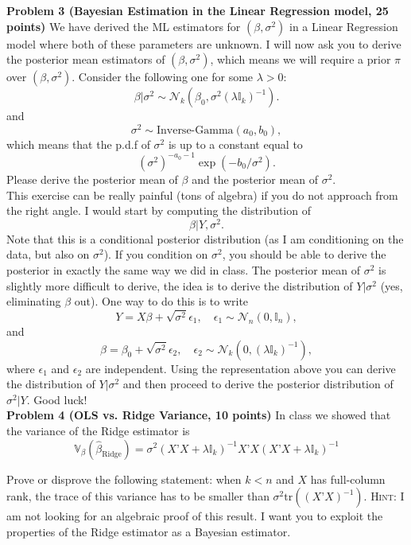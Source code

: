 \documentclass[11pt]{article} %
\begin{document}
\noindent \textbf{Problem 3 (Bayesian Estimation in the Linear Regression model, 25 points)} We have derived the ML estimators for $(\beta, \sigma^2)$ in a Linear Regression model where both of these parameters are unknown. I will now ask you to derive the posterior mean estimators of $(\beta, \sigma^2)$, which means we will require a prior $\pi$ over $(\beta, \sigma^2)$. Consider the following one for some $\lambda > 0$: 
\[ \beta | \sigma^2 \sim \mathcal{N}_k( \beta_0  , \sigma^2 (\lambda \mathbb{I}_k)^{-1} ).     \]
and
\[ \sigma^2 \sim \textrm{Inverse-Gamma} (a_0, b_0), \]
which means that the p.d.f of $\sigma^2$ is up to a constant equal to
\[ (\sigma^2)^{-a_0-1}  \exp \left ( -b_0 / \sigma^2  \right).\]
\noindent Please derive the posterior mean of $\beta$ and the posterior mean of $\sigma^2$. \\

 This exercise can be really painful (tons of algebra) if you do not approach from the right angle. I would start by computing the distribution of
\[ \beta | Y, \sigma^2.\]
Note that this is a conditional posterior distribution (as I am conditioning on the data, but also on $\sigma^2$). If you condition on $\sigma^2$, you should be able to derive the posterior in exactly the same way we did in class. The posterior mean of $\sigma^2$ is slightly more difficult to derive, the idea is to derive the distribution of $Y | \sigma^2$ (yes, eliminating $\beta$ out). One way to do this is to write
\[ Y = X\beta + \sqrt{\sigma^2} \epsilon_1, \quad \epsilon_1 \sim \mathcal{N}_n(0, \mathbb{I}_n), \]
and
\[ \beta = \beta_0 + \sqrt{\sigma^2} \epsilon_2, \quad \epsilon_2 \sim \mathcal{N}_k(0, (\lambda \mathbb{I}_k)^{-1}), \]
where $\epsilon_1$ and $\epsilon_2$ are independent. Using the representation above you can derive the distribution of $Y | \sigma^2$ and then proceed to derive the posterior distribution of $\sigma^2 | Y$.  Good luck!\\

\noindent \textbf{Problem 4 (OLS vs. Ridge Variance, 10 points)} In class we showed that the variance of the Ridge estimator is
\[ \mathbb{V}_{\beta} (\widehat{\beta}_{\textrm{Ridge}}) = \sigma^2( X’X + \lambda \mathbb{I}_k)^{-1} X’X ( X’X + \lambda \mathbb{I}_k)^{-1}  \]

\noindent Prove or disprove the following statement: when $k<n$ and $X$ has full-column rank, the trace of this variance has to be smaller than $\sigma^2 \textrm{tr}((X’X)^{-1})$. {\scshape Hint:} I am not looking for an algebraic proof of this result. I want you to exploit the properties of the Ridge estimator as a Bayesian estimator.   \\
\end{document}
